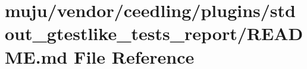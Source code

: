 \hypertarget{vendor_2ceedling_2plugins_2stdout__gtestlike__tests__report_2_r_e_a_d_m_e_8md}{}\section{muju/vendor/ceedling/plugins/stdout\+\_\+gtestlike\+\_\+tests\+\_\+report/\+R\+E\+A\+D\+ME.md File Reference}
\label{vendor_2ceedling_2plugins_2stdout__gtestlike__tests__report_2_r_e_a_d_m_e_8md}
